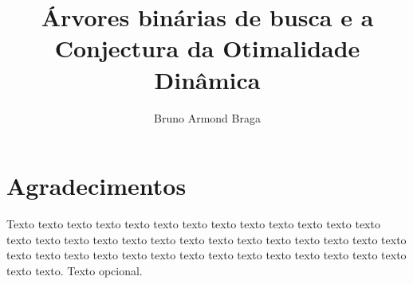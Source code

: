 \documentclass[a4paper,12pt,twoside,english,brazilian]{book}
\title{Árvores binárias de busca e a Conjectura da Otimalidade Dinâmica}
\author[masc]{Bruno Armond Braga}
\begin{document}

\frontmatter

\pagestyle{plain}

\onehalfspacing %

\maketitle %




\chapter*{Agradecimentos}

Texto texto texto texto texto texto texto texto texto texto texto texto texto
texto texto texto texto texto texto texto texto texto texto texto texto texto
texto texto texto texto texto texto texto texto texto texto texto texto texto
texto texto texto texto. Texto opcional.




\end{document}
